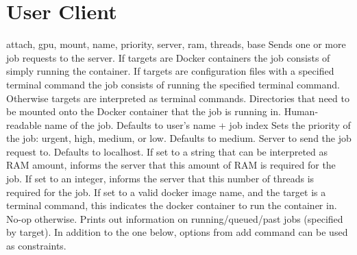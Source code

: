 \section{User Client}
{attach, gpu, mount, name, priority, server, ram, threads, base}
{Sends one or more job requests to the server.
If targets are Docker containers the job consists of simply running the container.
If targets are configuration files with a specified terminal command the job consists of running the specified terminal command.
Otherwise targets are interpreted as terminal commands.
}
\jaoptionheader
{}
{Directories that need to be mounted onto the Docker container that the job is running in.}
{Human-readable name of the job.
Defaults to user's name + job index}
{Sets the priority of the job: urgent, high, medium, or low.
Defaults to medium.}
{Server to send the job request to.
Defaults to localhost.}
{If set to a string that can be interpreted as RAM amount, informs the server that this amount of RAM is required for the job.}
{If set to an integer, informs the server that this number of threads is required for the job.}
{If set to a valid docker image name, and the target is a terminal command, this indicates the docker container to run the container in.
No-op otherwise.}
{Prints out information on running/queued/past jobs (specified by target).
In addition to the one below, options from add command can be used as constraints.}
\jaoptionheader
{}
